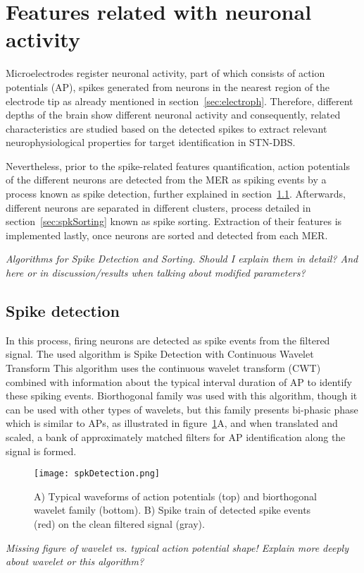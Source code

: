 \section{Features related with neuronal activity }
\label{sec:spkFeat}
Microelectrodes register neuronal activity, part of which consists of action potentials (AP), spikes generated from neurons in the nearest region of the electrode tip as already mentioned in section~\ref{sec:electroph}. Therefore, different depths of the brain show different neuronal activity and consequently, related characteristics are studied based on the detected spikes to extract relevant neurophysiological properties for target identification in STN-DBS.

Nevertheless, prior to the spike-related features quantification, action potentials of the different neurons are detected from the MER as spiking events by a process known as spike detection, further explained in section~\ref{sec:spkDetection}. Afterwards, different neurons are separated in different clusters, process detailed in section~\ref{sec:spkSorting} known as spike sorting. Extraction of their features is implemented lastly, once neurons are sorted and detected from each MER.

\textit{Algorithms for Spike Detection and Sorting. Should I explain them in detail? And here or in discussion/results when talking about modified parameters?}

\subsection{Spike detection}
\label{sec:spkDetection}
In this process, firing neurons are detected as spike events from the filtered signal. The used algorithm is Spike Detection with Continuous Wavelet Transform \cite{Nenadic2008}
 This algorithm uses the continuous wavelet transform (CWT) combined with information about the typical interval duration of AP to identify these spiking events. Biorthogonal family was used with this algorithm, though it can be used with other types of wavelets, but this family presents bi-phasic phase which is similar to APs, as illustrated in figure~\ref{fig:spkDetection}A,  and when translated and scaled, a bank of approximately matched filters for AP identification along the signal is formed.
 
\begin{figure}[!htb]
     \centering    
               \texttt{[image: spkDetection.png]} 
       \caption{A)  Typical waveforms of action potentials (top) and biorthogonal wavelet family (bottom). B) Spike train of detected spike events (red) on the clean filtered signal (gray).}
     \label{fig:spkDetection}
\end{figure} 
 \textit{ Missing figure of wavelet vs. typical action potential shape! 
 Explain more deeply about wavelet or this algorithm?}
 
